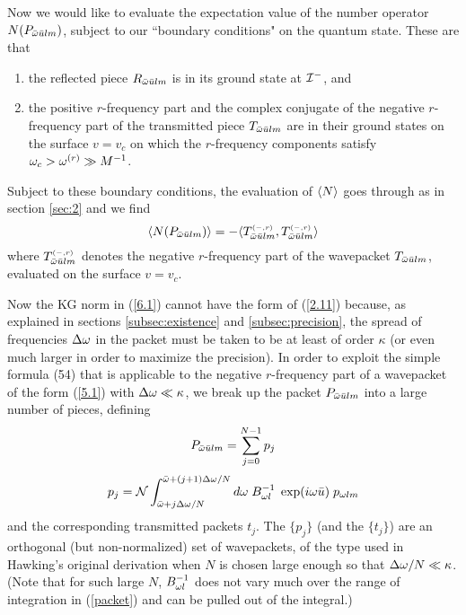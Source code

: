 Now we would like to evaluate the expectation value of the
number operator $N(P_{\bar{\omega}\bar{u} lm})$, subject to our
``boundary conditions" on the quantum state. These are
that
\begin{enumerate}
\item the reflected piece $R_{\bar{\omega}\bar{u} lm}$ is
in its ground state at ${\cal I}^-$, and
\item the positive $r$-frequency part and the
complex conjugate of the negative $r$-frequency part of the
transmitted piece $T_{\bar{\omega}\bar{u} lm}$ are in their ground
states on the surface $v=v_c$ on which the $r$-frequency
components satisfy $\omega_c>\omega^{(r)}\gg M^{-1}$.
\end{enumerate}
Subject to these boundary conditions, the evaluation of
$\langle N\rangle$ goes through as in section \ref{sec:2} and we find
\begin{equation}
\langle N(P_{\bar{\omega}\bar{u} lm})\rangle=
-\langle T^{\scriptscriptstyle(-,r)}_{\bar{\omega}\bar{u} lm},
T^{\scriptscriptstyle(-,r)}_{\bar{\omega}\bar{u} lm}\rangle
\label{6.1}
\end{equation}
where $T^{\scriptscriptstyle(-,r)}_{\bar{\omega}\bar{u} lm}$
denotes the negative $r$-frequency part of the wavepacket
$T_{\bar{\omega}\bar{u} lm}$, evaluated on the surface $v=v_c$.

Now the KG norm in (\ref{6.1}) cannot have the form of
(\ref{2.11}) because, as explained in sections
\ref{subsec:existence} and \ref{subsec:precision},
the spread of frequencies $\Delta\omega$ in the packet
must be taken to be at least of order $\kappa$
(or even much larger in order to maximize the precision).
In order to exploit the simple formula (54)
that is applicable to
the negative $r$-frequency part of a wavepacket of the
form (\ref{5.1}) with $\Delta\omega\ll\kappa$, we break up the packet
$P_{\bar{\omega}\bar{u} lm}$ into a large number of pieces, defining
\begin{equation} P_{\bar{\omega}\bar{u} lm}=\sum_{j=0}^{N-1} p_j
\label{6.2}
\end{equation}
\begin{equation} p_j={\cal N}
\int_{\bar{\omega}+j\Delta\omega/N}^{\bar{\omega}+(j+1)\Delta\omega/N}
d\omega\; B_{\omega l}^{-1}\;
\exp(i\omega\bar{u})\; p_{\omega lm}
\label{packet}
\end{equation}
and the corresponding transmitted packets $t_j$.
The $\{p_j\}$ (and the $\{t_j\}$) are an orthogonal (but
non-normalized) set of
wavepackets, of the type used in Hawking's original
derivation when $N$ is chosen large enough so that
$\Delta\omega/N\ll\kappa$.
(Note that for such large $N$, $B_{\omega l}^{-1}$ does not
vary much over the range of integration in
(\ref{packet}) and can be pulled out of the integral.)

